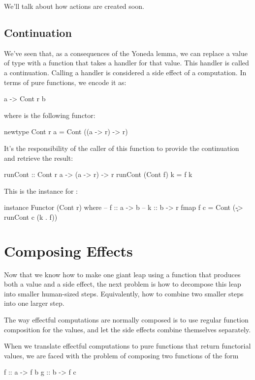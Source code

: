 \documentclass[DaoFP]{subfiles}
\begin{document}
We'll talk about how  actions are created soon.

\subsection{Continuation}

We've seen that, as a consequences of the Yoneda lemma, we can replace a value of type  with a function that takes a handler for that value. This handler is called a continuation. Calling a handler is considered a side effect of a computation. In terms of pure functions, we encode it as:
\begin{haskell}
a -> Cont r b
\end{haskell}
where  is the following functor:
\begin{haskell}
newtype Cont r a = Cont ((a -> r) -> r)
\end{haskell}
It's the responsibility of the caller of this function to provide the continuation and retrieve the result:
\begin{haskell}
runCont :: Cont r a -> (a -> r) -> r
runCont (Cont f) k = f k
\end{haskell}

This is the  instance for :
\begin{haskell}
instance Functor (Cont r) where
  -- f :: a -> b
  -- k :: b -> r
  fmap f c = Cont (\k -> runCont c (k . f))
\end{haskell}

\section{Composing Effects}

Now that we know how to make one giant leap using a function that produces both a value and a side effect, the next problem is how to decompose this leap into smaller human-sized steps. Equivalently, how to combine two smaller steps into one larger step. 

The way effectful computations are normally composed is to use regular function composition for the values, and let the side effects combine themselves separately. 

When we translate effectful computations to pure functions that return functorial values, we are faced with the problem of composing two functions of the form
\begin{haskell}
f :: a -> f b
g :: b -> f c
\end{haskell}
\end{document}
